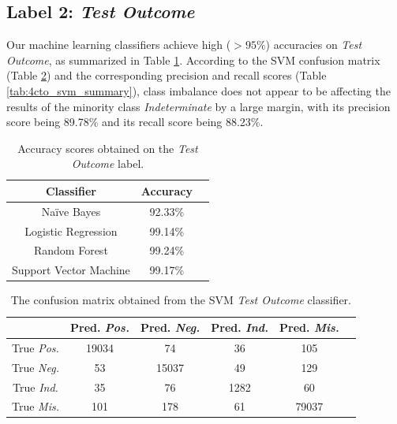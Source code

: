 \documentclass[sigconf]{acmart}
\newcommand{\naive}{Na\"ive }
\begin{document}
\subsection{Label 2: \textit{Test Outcome}}

Our machine learning classifiers achieve high ($> 95\%$) accuracies on \textit{Test Outcome}, as summarized in Table \ref{tab:to_accuracies}. According to the SVM confusion matrix (Table \ref{tab:4cto_svm_confusion}) and the corresponding precision and recall scores (Table \ref{tab:4cto_svm_summary}), class imbalance does not appear to be affecting the results of the minority class \textit{Indeterminate} by a large margin, with its precision score being 89.78\% and its recall score being 88.23\%.

\begin{table}
    \caption{Accuracy scores obtained on the \textit{Test Outcome} label.}
    \label{tab:to_accuracies}
    
    \centering
    \begin{tabular}{ccc}
        \toprule
        Classifier & Accuracy \\
        \midrule
        \naive Bayes & 92.33\% \\
        Logistic Regression & 99.14\% \\
        Random Forest & 99.24\% \\
        Support Vector Machine & 99.17\% \\
        \bottomrule
    \end{tabular}
\end{table}

\begin{table}
    \caption{The confusion matrix obtained from the SVM \textit{Test Outcome} classifier.}
    \label{tab:4cto_svm_confusion}
    
    \begin{tabularx}{\linewidth}{cccccc}
        \toprule
        & Pred. \textit{Pos.} & Pred. \textit{Neg.} & Pred. \textit{Ind.} & Pred. \textit{Mis.} \\
        \midrule
        True \textit{Pos.} & 19034 & 74 & 36 & 105 \\
        True \textit{Neg.} & 53 & 15037 & 49 & 129 \\
        True \textit{Ind.} & 35 & 76 & 1282 & 60 \\
        True \textit{Mis.} & 101 & 178 & 61 & 79037 \\
        \bottomrule
    \end{tabularx}
\end{table}
\end{document}
